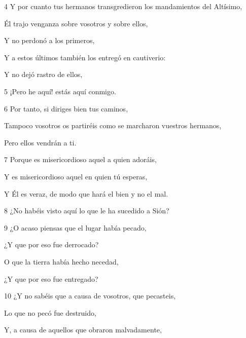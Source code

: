 \par 4 Y por cuanto tus hermanos transgredieron los mandamientos del Altísimo,

\par Él trajo venganza sobre vosotros y sobre ellos,

\par Y no perdonó a los primeros,

\par Y a estos últimos también los entregó en cautiverio:

\par Y no dejó rastro de ellos,

\par 5 ¡Pero he aquí! estás aquí conmigo.

\par 6 Por tanto, si diriges bien tus caminos,

\par Tampoco vosotros os partiréis como se marcharon vuestros hermanos,

\par Pero ellos vendrán a ti.

\par 7 Porque es misericordioso aquel a quien adoráis,

\par Y es misericordioso aquel en quien tú esperas,

\par Y Él es veraz, de modo que hará el bien y no el mal.

\par 8 ¿No habéis visto aquí lo que le ha sucedido a Sión?

\par 9 ¿O acaso piensas que el lugar había pecado,

\par ¿Y que por eso fue derrocado?

\par O que la tierra había hecho necedad,

\par ¿Y que por eso fue entregado?

\par 10 ¿Y no sabéis que a causa de vosotros, que pecasteis,

\par Lo que no pecó fue destruido,

\par Y, a causa de aquellos que obraron malvadamente,

